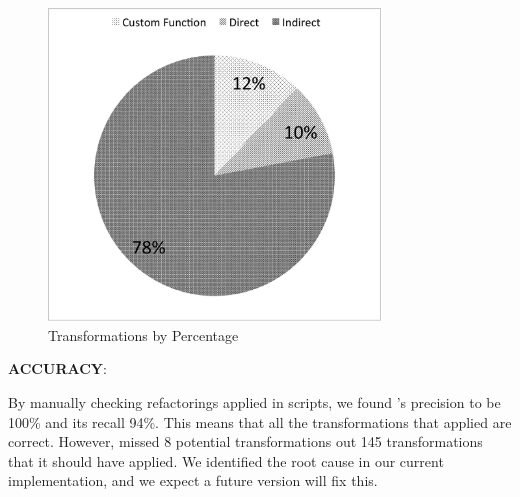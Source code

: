 \documentclass{sigplanconf}
\begin{document}
\begin{figure}[htbp!]
\begin{center}
\includegraphics[width=250pt]{images/TransformationsChart}
\nocaptionrule
\caption{Transformations by Percentage}
\label{fig:transformations_pieChart}
\end{center}
\end{figure}

\textbf{ACCURACY}: 

By manually checking refactorings applied in \numManual scripts, we found \tool's precision to be 100\% and its recall 94\%. This means that all the transformations that \tool applied are correct. However, \tool missed 8 potential transformations out 145 transformations that it should have applied. We identified the root cause in our current implementation, and we expect a future version will fix this.

%
\end{document}
